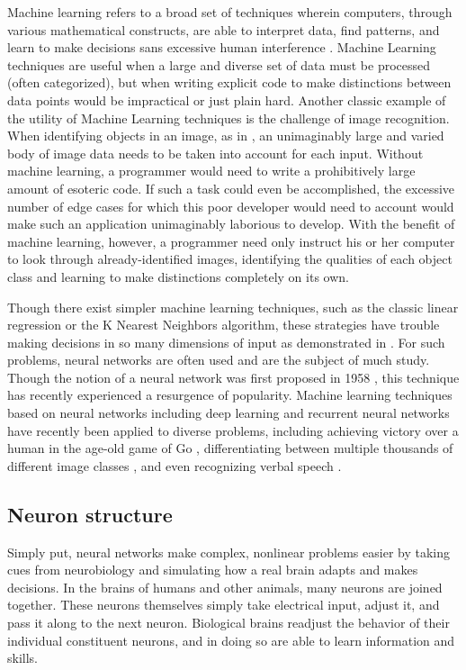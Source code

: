 \documentclass{article}
\begin{document}
Machine learning refers to a broad set of techniques wherein computers, through various mathematical constructs, are able to interpret data, find patterns, and learn to make decisions sans excessive human interference \cite{sasml}. Machine Learning techniques are useful when a large and diverse set of data must be processed (often categorized), but when writing explicit code to make distinctions between data points would be impractical or just plain hard. Another classic example of the utility of Machine Learning techniques is the challenge of image recognition. When identifying objects in an image, as in \cite{hinton12}, an unimaginably large and varied body of image data needs to be taken into account for each input. Without machine learning, a programmer would need to write a prohibitively large amount of esoteric code. If such a task could even be accomplished, the excessive number of edge cases for which this poor developer would need to account would make such an application unimaginably laborious to develop. With the benefit of machine learning, however, a programmer need only instruct his or her computer to look through already-identified images, identifying the qualities of each object class and learning to make distinctions completely on its own.

Though there exist simpler machine learning techniques, such as the classic linear regression or the K Nearest Neighbors algorithm, these strategies have trouble making decisions in so many dimensions of input as demonstrated in \cite{knnic}. For such problems, neural networks are often used and are the subject of much study. Though the notion of a neural network was first proposed in 1958 \cite{rosenblatt58}, this technique has recently experienced a resurgence of popularity. Machine learning techniques based on neural networks including deep learning \cite{mitdeeplearning} and recurrent neural networks \cite{recurrentsurvey} have recently been applied to diverse problems, including achieving victory over a human in the age-old game of Go \cite{go1}\cite{go2}, differentiating between multiple thousands of different image classes \cite{hinton12}, and even recognizing verbal speech \cite{rnnspoken}.

\subsection{Neuron structure}
Simply put, neural networks make complex, nonlinear problems easier by taking cues from neurobiology and simulating how a real brain adapts and makes decisions. In the brains of humans and other animals, many neurons are joined together. These neurons themselves simply take electrical input, adjust it, and pass it along to the next neuron. Biological brains readjust the behavior of their individual constituent neurons, and in doing so are able to learn information and skills.
\end{document}
